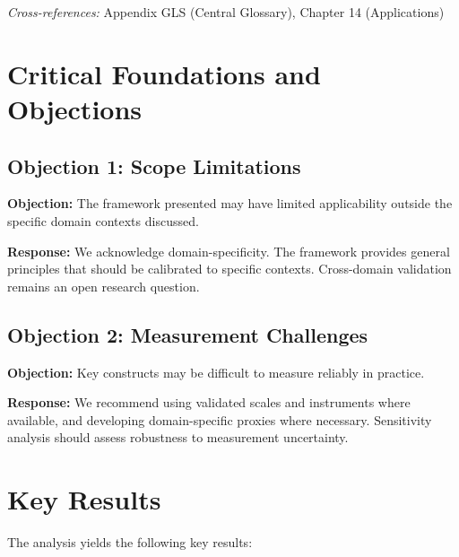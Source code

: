 \noindent\textit{Cross-references:}
Appendix GLS (Central Glossary), Chapter 14 (Applications)



\section{Critical Foundations and Objections}
\label{sec:ari-foundations}

\subsection{Objection 1: Scope Limitations}

\textbf{Objection:} The framework presented may have limited applicability
outside the specific domain contexts discussed.

\textbf{Response:} We acknowledge domain-specificity. The framework provides
general principles that should be calibrated to specific contexts. Cross-domain
validation remains an open research question.

\subsection{Objection 2: Measurement Challenges}

\textbf{Objection:} Key constructs may be difficult to measure reliably in
practice.

\textbf{Response:} We recommend using validated scales and instruments where
available, and developing domain-specific proxies where necessary. Sensitivity
analysis should assess robustness to measurement uncertainty.





\section{Key Results}
\label{sec:ari-results}

The analysis yields the following key results:

